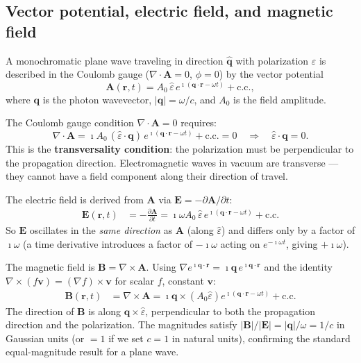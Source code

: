 \documentclass[11pt]{article}
\newcommand{\iunit}{\imath}          %
\newcommand{\Avec}{\mathbf{A}}
\newcommand{\Evec}{\mathbf{E}}
\newcommand{\Bvec}{\mathbf{B}}
\begin{document}
\subsection{Vector potential, electric field, and magnetic field}

A monochromatic plane wave traveling in direction $\hat{\mathbf{q}}$
with polarization $\hat{\varepsilon}$ is described in the Coulomb
gauge ($\nabla\cdot\Avec=0$, $\phi=0$) by the vector potential
\begin{equation}
  \Avec(\mathbf{r},t)
  = A_0\,\hat{\varepsilon}\,
    e^{\iunit(\mathbf{q}\cdot\mathbf{r}-\omega t)}
    + \text{c.c.},
  \label{eq:A-planewave}
\end{equation}
where $\mathbf{q}$ is the photon wavevector, $|\mathbf{q}|=\omega/c$,
and $A_0$ is the field amplitude.

The Coulomb gauge condition $\nabla\cdot\Avec=0$ requires:
\begin{equation}
  \nabla\cdot\Avec
  = \iunit A_0\,(\hat{\varepsilon}\cdot\mathbf{q})\,
    e^{\iunit(\mathbf{q}\cdot\mathbf{r}-\omega t)} + \text{c.c.}
  = 0
  \quad\Rightarrow\quad
  \hat{\varepsilon}\cdot\mathbf{q} = 0.
  \label{eq:transversality}
\end{equation}
This is the \textbf{transversality condition}: the polarization
must be perpendicular to the propagation direction.
Electromagnetic waves in vacuum are transverse --- they cannot
have a field component along their direction of travel.

\medskip

The electric field is derived from $\Avec$ via
$\Evec = -\partial\Avec/\partial t$:
\begin{align}
  \Evec(\mathbf{r},t)
  &= -\frac{\partial\Avec}{\partial t}
   = \iunit\omega A_0\,\hat{\varepsilon}\,
     e^{\iunit(\mathbf{q}\cdot\mathbf{r}-\omega t)}
     + \text{c.c.}
  \label{eq:E-planewave}
\end{align}
So $\Evec$ oscillates in the \emph{same direction} as $\Avec$
(along $\hat{\varepsilon}$) and differs only by a factor of
$\iunit\omega$ (a time derivative introduces a factor of $-\iunit\omega$
acting on $e^{-\iunit\omega t}$, giving $+\iunit\omega$).

The magnetic field is $\Bvec = \nabla\times\Avec$.
Using $\nabla e^{\iunit\mathbf{q}\cdot\mathbf{r}}
= \iunit\mathbf{q}\,e^{\iunit\mathbf{q}\cdot\mathbf{r}}$
and the identity $\nabla\times(f\mathbf{v})
= (\nabla f)\times\mathbf{v}$ for scalar $f$, constant $\mathbf{v}$:
\begin{align}
  \Bvec(\mathbf{r},t)
  &= \nabla\times\Avec
   = \iunit\mathbf{q}\times
     \!\left(A_0\hat{\varepsilon}\right)
     e^{\iunit(\mathbf{q}\cdot\mathbf{r}-\omega t)}
     + \text{c.c.}
  \label{eq:B-planewave}
\end{align}
The direction of $\Bvec$ is along $\mathbf{q}\times\hat{\varepsilon}$,
perpendicular to both the propagation direction and the polarization.
The magnitudes satisfy $|\Bvec|/|\Evec| = |\mathbf{q}|/\omega = 1/c$
in Gaussian units (or $=1$ if we set $c=1$ in natural units),
confirming the standard equal-magnitude result for a plane wave.
\end{document}
